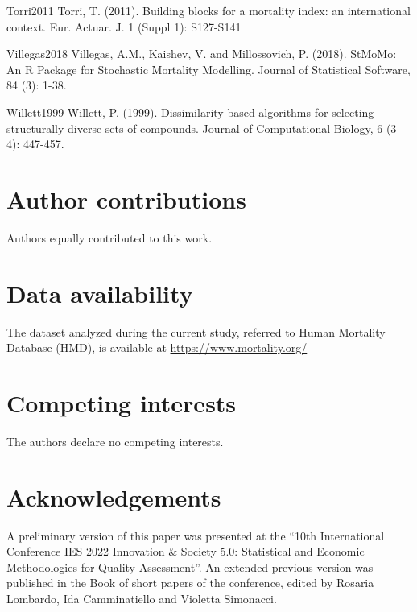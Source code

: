 \documentclass[fleqn,10pt]{wlscirep}
\begin{document}
\begin{thebibliography}{99}
\bibitem%
{Torri2011}
Torri, T. (2011). Building blocks for a mortality index: an international context. Eur. Actuar. J. 1 (Suppl 1): S127-S141

\bibitem%
{Villegas2018}
Villegas, A.M., Kaishev, V. and Millossovich, P. (2018). StMoMo: An R Package for Stochastic Mortality Modelling. Journal of Statistical Software, 84 (3): 1-38.

\bibitem%
{Willett1999}
Willett, P. (1999). Dissimilarity-based algorithms for selecting structurally diverse sets of compounds. Journal of Computational Biology, 6 (3-4): 447-457.
 
\end{thebibliography}


\section*{Author contributions}
Authors equally contributed to this work.

\section*{Data availability}
The dataset analyzed during the current study, referred to Human Mortality Database (HMD), is available at \url{https://www.mortality.org/}

\section*{Competing interests}
The authors declare no competing interests.

\section*{Acknowledgements}
A preliminary version of this paper was presented at the “10th International Conference IES 2022 Innovation \& Society 5.0: Statistical and Economic Methodologies for Quality Assessment”. An extended previous version was published in the Book of short papers of the conference, edited by Rosaria Lombardo, Ida Camminatiello and Violetta Simonacci.
\end{document}
